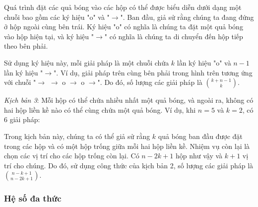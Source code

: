 Quá trình đặt các quả bóng vào các hộp
có thể được biểu diễn dưới dạng một chuỗi
bao gồm các ký hiệu
"o" và "$\rightarrow$".
Ban đầu, giả sử rằng chúng ta đang đứng ở hộp ngoài cùng bên trái.
Ký hiệu "o" có nghĩa là chúng ta đặt một quả bóng
vào hộp hiện tại, và ký hiệu
"$\rightarrow$" có nghĩa là chúng ta di chuyển đến
hộp tiếp theo bên phải.

Sử dụng ký hiệu này, mỗi giải pháp là một chuỗi
chứa $k$ lần ký hiệu "o" và
$n-1$ lần ký hiệu "$\rightarrow$".
Ví dụ, giải pháp trên cùng bên phải
trong hình trên tương ứng với chuỗi
"$\rightarrow$ $\rightarrow$ o $\rightarrow$ o $\rightarrow$".
Do đó, số lượng các giải pháp là
${k+n-1 \choose k}$.

\textit{Kịch bản 3}: Mỗi hộp có thể chứa nhiều nhất một quả bóng,
và ngoài ra, không có hai hộp liền kề nào có thể cùng chứa một quả bóng.
Ví dụ, khi $n=5$ và $k=2$,
có 6 giải pháp:


\begin{center}
\end{center}

Trong kịch bản này, chúng ta có thể giả sử rằng
$k$ quả bóng ban đầu được đặt trong các hộp
và có một hộp trống giữa mỗi
hai hộp liền kề.
Nhiệm vụ còn lại là chọn các
vị trí cho các hộp trống còn lại.
Có $n-2k+1$ hộp như vậy và
$k+1$ vị trí cho chúng.
Do đó, sử dụng công thức của kịch bản 2,
số lượng các giải pháp là
${n-k+1 \choose n-2k+1}$.

\subsubsection{Hệ số đa thức}


